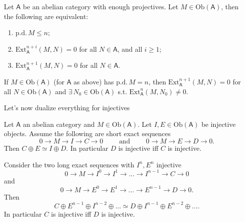 \begin{prop}
	Let $\mathsf{A}$ be an abelian category with enough projectives.
	Let $M \in \mathrm{Ob} \left(\mathsf{A}\right)$, then the following are equivalent:
	\begin{enumerate}
		\item $\mathrm{p.d.}\, M \leq n$;
		\item $\mathrm{Ext}^{n+i}_{\mathsf{A}} (M,N) = 0$ for all $N \in \mathsf{A}$, and all $i \geq 1$;
		\item $\mathrm{Ext}^{n+1}_{\mathsf{A}} (M,N) = 0$ for all $N \in \mathsf{A}$.
	\end{enumerate}
\end{prop} 
\begin{cor}
	If $M \in \mathrm{Ob} \left(\mathsf{A}\right)$ (for $\mathsf{A}$ as above) 
	has $\mathrm{p.d.}\, M = n$, then
	$\mathrm{Ext}^{n+1}_{\mathsf{A}}(M,N) = 0$ for all $N \in \mathrm{Ob} \left(\mathsf{A}\right)$
	and $\exists\, N_0 \in \mathrm{Ob} \left(\mathsf{A}\right)$ s.t.
	$\mathrm{Ext}^n_{\mathsf{A}}(M,N_0) \neq 0$.
\end{cor} 
Let's now dualize everything for injectives
\begin{lem}
	Let $\mathsf{A}$ an abelian category and $M \in \mathrm{Ob} \left(\mathsf{A}\right)$.
	Let $I, E \in \mathrm{Ob} \left(\mathsf{A}\right)$ be injective objects.
	Assume the following are short exact sequences
	\begin{equation}
	0 \to M \to I \to C \to 0
	\qquad \text{ and } \qquad
	0 \to M \to E \to D \to 0
	.\end{equation} 
	Then $C \oplus E \simeq I \oplus D$.
	In particular $D$ is injective iff $C$ is injective.
\end{lem} 

\begin{cor}
	Consider the two long exact sequences with $I^n, E^n$ injective
	\begin{equation}
	0 \to M \to I^0 \to I^1 \to \ldots \to I^{n-1} \to C \to 0
	\end{equation} 
	and
	\begin{equation}
	0 \to M \to E^0 \to E^1 \to \ldots \to E^{n-1} \to D \to 0
	.\end{equation} 
	Then 
	\begin{equation}
	C \oplus E^{n-1} \oplus I^{n-2} \oplus \ldots \simeq
	D \oplus I^{n-1} \oplus E^{n-2} \oplus \ldots
	.\end{equation} 
	In particular $C$ is injective iff $D$ is injective.
\end{cor} 

